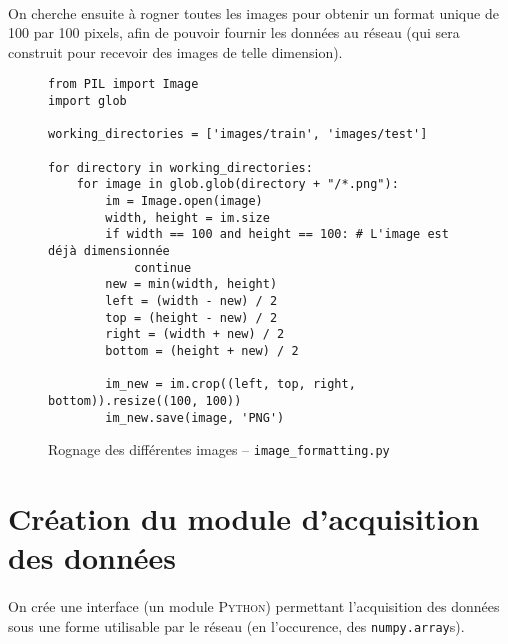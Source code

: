\documentclass{article}
\begin{document}
  \paragraph{} On cherche ensuite à rogner toutes les images pour obtenir un format unique de 100 par 100 pixels, afin de pouvoir fournir les données au réseau (qui sera construit pour recevoir des images de telle dimension).

  \begin{figure}[h]
    \begin{lstlisting}[style=Py]
from PIL import Image
import glob

working_directories = ['images/train', 'images/test']

for directory in working_directories:
    for image in glob.glob(directory + "/*.png"):
        im = Image.open(image)
        width, height = im.size
        if width == 100 and height == 100: # L'image est déjà dimensionnée
            continue
        new = min(width, height)
        left = (width - new) / 2
        top = (height - new) / 2
        right = (width + new) / 2
        bottom = (height + new) / 2

        im_new = im.crop((left, top, right, bottom)).resize((100, 100))
        im_new.save(image, 'PNG')
\end{lstlisting}
    \caption{Rognage des différentes images -- \texttt{image\_formatting.py}}
  \end{figure}

\section{Création du module d'acquisition des données}

\paragraph{} On crée une interface (un module \textsc{Python}) permettant l'acquisition des données sous une forme utilisable par le réseau (en l'occurence, des \texttt{numpy.array}s).
\end{document}
